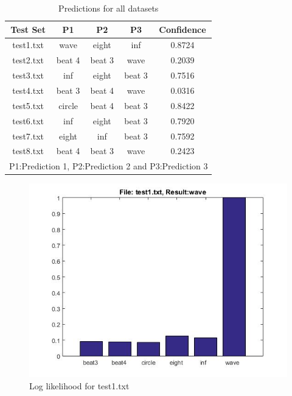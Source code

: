 \documentclass[fleqn,10pt]{SelfArx} %
\begin{document}
\begin{table}
\centering
\caption{Predictions for all datasets}
\begin{tabular}{ccccc}
\toprule
Test Set & P1 & P2 & P3 & Confidence \\ 
\midrule
test1.txt & wave & eight & inf & 0.8724 \\
test2.txt & beat 4 & beat 3 & wave & 0.2039 \\ 
test3.txt & inf & eight & beat 3 & 0.7516 \\ 
test4.txt & beat 3 & beat 4 & wave & 0.0316 \\ 
test5.txt & circle & beat 4 & beat 3 & 0.8422 \\ 
test6.txt & inf & eight & beat 3 & 0.7920 \\ 
test7.txt & eight & inf & beat 3 & 0.7592 \\ 
test8.txt & beat 4 & beat 3 & wave & 0.2423 \\ 
\bottomrule
\multicolumn{5}{c}{P1:Prediction 1, P2:Prediction 2 and P3:Prediction 3} \\
\end{tabular} 
\label{tab:res}
\end{table}

\begin{figure}[hbtp]
\centering
\includegraphics[scale=0.45]{test1.jpg}
\caption{Log likelihood for test1.txt}
\label{fig:test1}
\end{figure}
\end{document}
